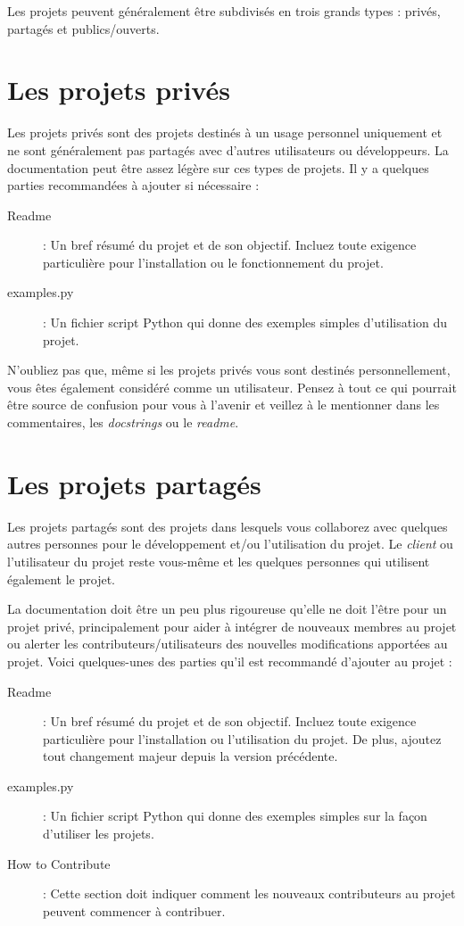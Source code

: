 \documentclass[a4paper,11pt]{book}
\begin{document}
Les projets peuvent généralement être subdivisés en trois grands types : privés, partagés et publics/ouverts.
\medskip

\section{Les projets privés}
Les projets privés sont des projets destinés à un usage personnel uniquement et ne sont généralement pas partagés avec d'autres utilisateurs ou développeurs. La documentation peut être assez légère sur ces types de projets. Il y a quelques parties recommandées à ajouter si nécessaire :
\begin{description}
	\item[Readme] : Un bref résumé du projet et de son objectif. Incluez toute exigence particulière pour l'installation ou le fonctionnement du projet.
	\item[examples.py] : Un fichier script Python qui donne des exemples simples d'utilisation du projet.
\end{description}
\medskip

N'oubliez pas que, même si les projets privés vous sont destinés personnellement, vous êtes également considéré comme un utilisateur. Pensez à tout ce qui pourrait être source de confusion pour vous à l'avenir et veillez à le mentionner dans les commentaires, les \textit{docstrings} ou le \textit{readme}.
\medskip

\section{Les projets partagés}
Les projets partagés sont des projets dans lesquels vous collaborez avec quelques autres personnes pour le développement et/ou l'utilisation du projet. Le \og \textit{client}\fg{} ou l'utilisateur du projet reste vous-même et les quelques personnes qui utilisent également le projet.
\medskip

La documentation doit être un peu plus rigoureuse qu'elle ne doit l'être pour un projet privé, principalement pour aider à intégrer de nouveaux membres au projet ou alerter les contributeurs/utilisateurs des nouvelles modifications apportées au projet. Voici quelques-unes des parties qu'il est recommandé d'ajouter au projet :
\begin{description}
	\item[Readme] : Un bref résumé du projet et de son objectif. Incluez toute exigence particulière pour l'installation ou l'utilisation du projet. De plus, ajoutez tout changement majeur depuis la version précédente.
	\item[examples.py] : Un fichier script Python qui donne des exemples simples sur la façon d'utiliser les projets.
	\item[How to Contribute] : Cette section doit indiquer comment les nouveaux contributeurs au projet peuvent commencer à contribuer.
\end{description}
\medskip
\end{document}
